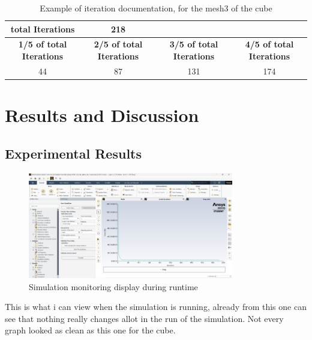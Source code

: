 \documentclass[12pt,a4paper]{article}
\begin{document}
\begin{table}[H]
\centering
\caption{Example of iteration documentation, for the mesh3 of the cube}
\label{tab:iteration_example}
\begin{tabular}{|c|c|c|c|}
\hline
\rowcolor{red!50}
\textbf{total Iterations} & \textbf{218} &  &  \\
\hline
\textbf{1/5 of total Iterations} & \textbf{2/5 of total Iterations} & \textbf{3/5 of total Iterations} & \textbf{4/5 of total Iterations} \\
\hline
44 & 87 & 131 & 174 \\
\hline
\end{tabular}
\end{table}
\section{Results and Discussion}

\subsection{Experimental Results}

\begin{figure}[H]
    \centering
    \includegraphics[width=0.8\textwidth]{image8.png}
    \caption{Simulation monitoring display during runtime}
    \label{fig:simulation_display}
\end{figure}

This is what i can view when the simulation is running, already from this one can see that nothing really changes allot in the run of the simulation. Not every graph looked as clean as this one for the cube.
\end{document}
